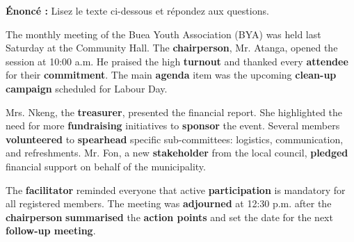 \documentclass[11pt]{article}
\begin{document}
\begin{exoresolu}
\textbf{Énoncé :} Lisez le texte ci-dessous et répondez aux questions.

\begin{textebox}
The monthly meeting of the Buea Youth Association (BYA) was held last Saturday at the Community Hall. The \textbf{chairperson}, Mr. Atanga, opened the session at 10:00 a.m. He praised the high \textbf{turnout} and thanked every \textbf{attendee} for their \textbf{commitment}. The main \textbf{agenda} item was the upcoming \textbf{clean-up campaign} scheduled for Labour Day. 

Mrs. Nkeng, the \textbf{treasurer}, presented the financial report. She highlighted the need for more \textbf{fundraising} initiatives to \textbf{sponsor} the event. Several members \textbf{volunteered} to \textbf{spearhead} specific sub-committees: logistics, communication, and refreshments. Mr. Fon, a new \textbf{stakeholder} from the local council, \textbf{pledged} financial support on behalf of the municipality. 

The \textbf{facilitator} reminded everyone that active \textbf{participation} is mandatory for all registered members. The meeting was \textbf{adjourned} at 12:30 p.m. after the \textbf{chairperson} \textbf{summarised} the \textbf{action points} and set the date for the next \textbf{follow-up meeting}.
\end{textebox}


\end{exoresolu}
\end{document}

